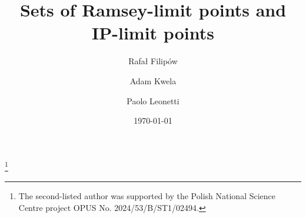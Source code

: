 \documentclass{amsart}
\theoremstyle{plain}
\theoremstyle{definition}
\theoremstyle{remark}
\begin{document}

\title[Sets of Ramsey-limit points and IP-limit points]{Sets of Ramsey-limit points and IP-limit points}


\author[R.~Filip\'{o}w]{Rafa\l{} Filip\'{o}w}
\address[Rafa\l{}~Filip\'{o}w]{Institute of Mathematics\\ Faculty of Mathematics, Physics and Informatics\\ University of Gda\'{n}sk\\ ul.~Wita Stwosza 57\\ 80-308 Gda\'{n}sk\\ Poland}

\author[A.~Kwela]{Adam Kwela}
\address[Adam Kwela]{Institute of Mathematics\\ Faculty of Mathematics\\ Physics and Informatics\\ University of Gda\'{n}sk\\ ul.~Wita  Stwosza 57\\ 80-308 Gda\'{n}sk\\ Poland}

\author[P.~Leonetti]{Paolo Leonetti}
\address[Paolo Leonetti]{Department of Economics\\ Universit\'{a} degli Studi dell’Insubria\\ via Monte Generoso 71 \\ Varese 21100\\ Italy}

\thanks{The second-listed author was supported by the Polish National Science Centre project OPUS No. 2024/53/B/ST1/02494.}


\date{\today}



\end{document}
